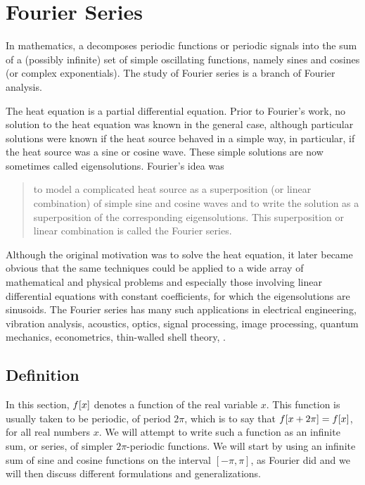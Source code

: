 \section{Fourier Series}
In mathematics, a  decomposes periodic functions or periodic signals into the sum of a (possibly infinite) set of simple oscillating functions, namely sines and cosines (or complex exponentials). The study of Fourier series is a branch of Fourier analysis.

The heat equation is a partial differential equation. Prior to Fourier's work, no solution to the heat equation was known in the general case, although particular solutions were known if the heat source behaved in a simple way, in particular, if the heat source was a sine or cosine wave. These simple solutions are now sometimes called eigensolutions. Fourier's idea was 
\begin{quote}
to model a complicated heat source as a superposition (or linear combination) of simple sine and cosine waves and to write the solution as a superposition of the corresponding eigensolutions. This superposition or linear combination is called the Fourier series.
\end{quote}

Although the original motivation was to solve the heat equation, it later became obvious that the same techniques could be applied to a wide array of mathematical and physical problems and especially those involving linear differential equations with constant coefficients, for which the eigensolutions are sinusoids. The Fourier series has many such applications in electrical engineering, vibration analysis, acoustics, optics, signal processing, image processing, quantum mechanics, econometrics, thin-walled shell theory, \etc.


\subsection{Definition}
In this section, $f\!\left[{x}\right]$ denotes a function of the real variable $x$. This function is usually taken to be periodic, of period $2\pi$, which is to say that $f\!\left[{x + 2\pi}\right] = f\!\left[{x}\right]$, for all real numbers $x$. We will attempt to write such a function as an infinite sum, or series, of simpler $2\pi$-periodic functions. We will start by using an infinite sum of sine and cosine functions on the interval $[-\pi,\pi]$, as Fourier did and we will then discuss different formulations and generalizations.


